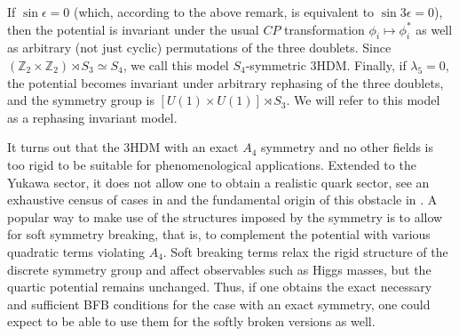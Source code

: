 \documentclass[11pt]{article}
\newcommand{\Z}{\mathbb{Z}}
\begin{document}
If $\sin\epsilon = 0$ (which, according to the above remark, is equivalent to $\sin 3\epsilon = 0$),
then the potential is invariant under the usual $CP$ transformation $\phi_i \mapsto \phi_i^*$
as well as arbitrary (not just cyclic) permutations of the three doublets.
Since $(\Z_2 \times \Z_2) \rtimes S_3 \simeq S_4$, we call this model $S_4$-symmetric 3HDM.
Finally, if $\lambda_5 = 0$, the potential becomes invariant under arbitrary rephasing of the three doublets,
and the symmetry group is $[U(1)\times U(1)] \rtimes S_3$.
We will refer to this model as a rephasing invariant model.

It turns out that the 3HDM with an exact $A_4$ symmetry and no other fields 
is too rigid to be suitable for phenomenological applications. 
Extended to the Yukawa sector, it does not allow one to obtain a realistic quark sector,
see an exhaustive census of cases in \cite{Felipe:2013ie,Felipe:2013vwa} 
and the fundamental origin of this obstacle in \cite{Felipe:2014zka}.
A popular way to make use of the structures imposed by the symmetry is to allow for soft symmetry breaking,
that is, to complement the potential with various quadratic terms violating $A_4$.
Soft breaking terms relax the rigid structure of the discrete symmetry group
and affect observables such as Higgs masses, but the quartic potential remains unchanged.
Thus, if one obtains the exact necessary and sufficient BFB conditions for the case with an exact symmetry,
one could expect to be able to use them for the softly broken versions as well.
\end{document}

